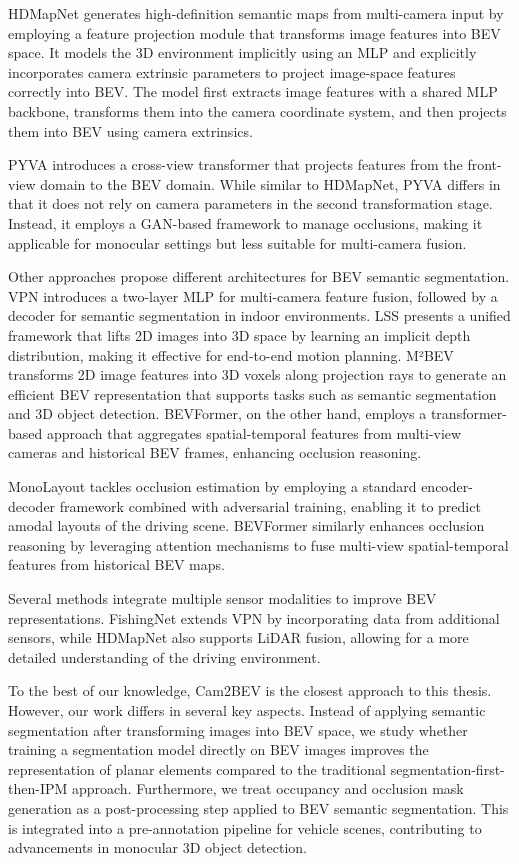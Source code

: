 HDMapNet generates high-definition semantic maps from multi-camera input by employing a feature projection module that transforms image features into BEV space. It models the 3D environment implicitly using an MLP and explicitly incorporates camera extrinsic parameters to project image-space features correctly into BEV. The model first extracts image features with a shared MLP backbone, transforms them into the camera coordinate system, and then projects them into BEV using camera extrinsics.

PYVA introduces a cross-view transformer that projects features from the front-view domain to the BEV domain. While similar to HDMapNet, PYVA differs in that it does not rely on camera parameters in the second transformation stage. Instead, it employs a GAN-based framework to manage occlusions, making it applicable for monocular settings but less suitable for multi-camera fusion.

Other approaches propose different architectures for BEV semantic segmentation. VPN introduces a two-layer MLP for multi-camera feature fusion, followed by a decoder for semantic segmentation in indoor environments. LSS presents a unified framework that lifts 2D images into 3D space by learning an implicit depth distribution, making it effective for end-to-end motion planning. M²BEV transforms 2D image features into 3D voxels along projection rays to generate an efficient BEV representation that supports tasks such as semantic segmentation and 3D object detection. BEVFormer, on the other hand, employs a transformer-based approach that aggregates spatial-temporal features from multi-view cameras and historical BEV frames, enhancing occlusion reasoning.

MonoLayout tackles occlusion estimation by employing a standard encoder-decoder framework combined with adversarial training, enabling it to predict amodal layouts of the driving scene. BEVFormer similarly enhances occlusion reasoning by leveraging attention mechanisms to fuse multi-view spatial-temporal features from historical BEV maps.

Several methods integrate multiple sensor modalities to improve BEV representations. FishingNet extends VPN by incorporating data from additional sensors, while HDMapNet also supports LiDAR fusion, allowing for a more detailed understanding of the driving environment.

To the best of our knowledge, Cam2BEV is the closest approach to this thesis. However, our work differs in several key aspects. Instead of applying semantic segmentation after transforming images into BEV space, we study whether training a segmentation model directly on BEV images improves the representation of planar elements compared to the traditional segmentation-first-then-IPM approach. Furthermore, we treat occupancy and occlusion mask generation as a post-processing step applied to BEV semantic segmentation. This is integrated into a pre-annotation pipeline for vehicle scenes, contributing to advancements in monocular 3D object detection.

